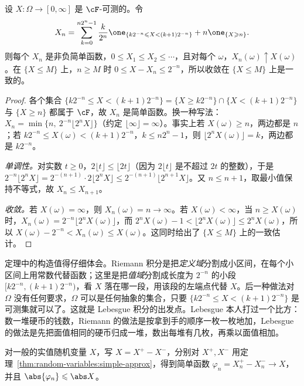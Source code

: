 \begin{theorem}[简单函数逼近]\label{thm:random-variables:simple-approx}
设 $X:\Omega\to[0,\infty]$ 是 $\cF$-可测的。令
\[
X_n=\sum_{k=0}^{n2^n-1}\frac{k}{2^n}\one_{\{k2^{-n}\leqslant X<(k+1)2^{-n}\}}+n\one_{\{X\geqslant n\}}.
\]
则每个 $X_n$ 是非负简单函数，$0\leqslant X_1\leqslant X_2\leqslant\cdots$，且对每个 $\omega$，$X_n(\omega)\uparrow X(\omega)$。在 $\{X\leqslant M\}$ 上，$n\geqslant M$ 时 $0\leqslant X-X_n\leqslant2^{-n}$，所以收敛在 $\{X\leqslant M\}$ 上是一致的。
\end{theorem}
\begin{proof}
各个集合 $\{k2^{-n}\leqslant X<(k+1)2^{-n}\}=\{X\geqslant k2^{-n}\}\cap\{X<(k+1)2^{-n}\}$ 与 $\{X\geqslant n\}$ 都属于 $\cF$，故 $X_n$ 是简单函数。换一种写法：$X_n=\min\{n,\ 2^{-n}\lfloor2^nX\rfloor\}$（约定 $\lfloor\infty\rfloor=\infty$）。事实上若 $X(\omega)\geqslant n$，两边都是 $n$；若 $k2^{-n}\leqslant X(\omega)<(k+1)2^{-n}$，$k\leqslant n2^n-1$，则 $\lfloor2^nX(\omega)\rfloor=k$，两边都是 $k2^{-n}$。

\emph{单调性。}对实数 $t\geqslant0$，$2\lfloor t\rfloor\leqslant\lfloor2t\rfloor$（因为 $2\lfloor t\rfloor$ 是不超过 $2t$ 的整数），于是 $2^{-n}\lfloor2^nX\rfloor=2^{-(n+1)}\cdot2\lfloor2^nX\rfloor\leqslant2^{-(n+1)}\lfloor2^{n+1}X\rfloor$。又 $n\leqslant n+1$，取最小值保持不等式，故 $X_n\leqslant X_{n+1}$。

\emph{收敛。}若 $X(\omega)=\infty$，则 $X_n(\omega)=n\to\infty$。若 $X(\omega)<\infty$，当 $n\geqslant X(\omega)$ 时，$X_n(\omega)=2^{-n}\lfloor2^nX(\omega)\rfloor$，而 $2^nX(\omega)-1<\lfloor2^nX(\omega)\rfloor\leqslant2^nX(\omega)$，所以 $X(\omega)-2^{-n}<X_n(\omega)\leqslant X(\omega)$。这同时给出了 $\{X\leqslant M\}$ 上的一致估计。
\end{proof}

\begin{remark}[分割值域]
定理中的构造值得仔细体会。Riemann 积分是把\emph{定义域}分割成小区间，在每个小区间上用常数代替函数；这里是把\emph{值域}分割成长度为 $2^{-n}$ 的小段 $[k2^{-n},(k+1)2^{-n})$，看 $X$ 落在哪一段，用该段的左端点代替 $X$。后一种做法对 $\Omega$ 没有任何要求，$\Omega$ 可以是任何抽象的集合，只要 $\{k2^{-n}\leqslant X<(k+1)2^{-n}\}$ 是可测集就可以了。这就是 Lebesgue 积分的出发点。Lebesgue 本人打过一个比方：数一堆硬币的钱数，Riemann 的做法是按拿到手的顺序一枚一枚地加，Lebesgue 的做法是先把面值相同的硬币归成一堆，数出每堆有几枚，再乘以面值相加。
\end{remark}

对一般的实值随机变量 $X$，写 $X=X^+-X^-$，分别对 $X^+,X^-$ 用定理~\ref{thm:random-variables:simple-approx}，得到简单函数 $\varphi_n=X_n^+-X_n^-\to X$，并且 $\abs{\varphi_n}\leqslant\abs X$。

